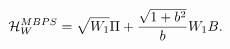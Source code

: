 \begin{equation}
\label{bpsene3}
{\cal H}_{W}^{MBPS} = \sqrt{W_1} \Pi +
\frac{\sqrt{1 + b^2}}{b} W_1 B.
\end{equation}

